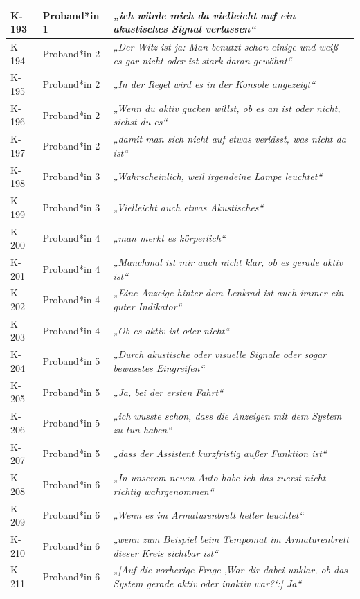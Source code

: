 {\begin{xltabular}{\textwidth}{
    |P{0.10\textwidth}
    |P{0.17\textwidth}
    |Y|
}
K-193 & Proband*in 1 & \textit{„ich würde mich da vielleicht auf ein akustisches Signal verlassen“} \\
\hline
K-194 & Proband*in 2 & \textit{„Der Witz ist ja: Man benutzt schon einige und weiß es gar nicht oder ist stark daran gewöhnt“} \\
\hline
K-195 & Proband*in 2 & \textit{„In der Regel wird es in der Konsole angezeigt“} \\
\hline
K-196 & Proband*in 2 & \textit{„Wenn du aktiv gucken willst, ob es an ist oder nicht, siehst du es“} \\
\hline
K-197 & Proband*in 2 & \textit{„damit man sich nicht auf etwas verlässt, was nicht da ist“} \\
\hline
K-198 & Proband*in 3 & \textit{„Wahrscheinlich, weil irgendeine Lampe leuchtet“} \\
\hline
K-199 & Proband*in 3 & \textit{„Vielleicht auch etwas Akustisches“} \\
\hline
K-200 & Proband*in 4 & \textit{„man merkt es körperlich“} \\
\hline
K-201 & Proband*in 4 & \textit{„Manchmal ist mir auch nicht klar, ob es gerade aktiv ist“} \\
\hline
K-202 & Proband*in 4 & \textit{„Eine Anzeige hinter dem Lenkrad ist auch immer ein guter Indikator“} \\
\hline
K-203 & Proband*in 4 & \textit{„Ob es aktiv ist oder nicht“} \\
\hline
K-204 & Proband*in 5 & \textit{„Durch akustische oder visuelle Signale oder sogar bewusstes Eingreifen“} \\
\hline
K-205 & Proband*in 5 & \textit{„Ja, bei der ersten Fahrt“} \\
\hline
K-206 & Proband*in 5 & \textit{„ich wusste schon, dass die Anzeigen mit dem System zu tun haben“} \\
\hline
K-207 & Proband*in 5 & \textit{„dass der Assistent kurzfristig außer Funktion ist“} \\
\hline
K-208 & Proband*in 6 & \textit{„In unserem neuen Auto habe ich das zuerst nicht richtig wahrgenommen“} \\
\hline
K-209 & Proband*in 6 & \textit{„Wenn es im Armaturenbrett heller leuchtet“} \\
\hline
K-210 & Proband*in 6 & \textit{„wenn zum Beispiel beim Tempomat im Armaturenbrett dieser Kreis sichtbar ist“} \\
\hline
K-211 & Proband*in 6 & \textit{„[Auf die vorherige Frage ‚War dir dabei unklar, ob das System gerade aktiv oder inaktiv war?‘:] Ja“} \\

\end{xltabular}}

